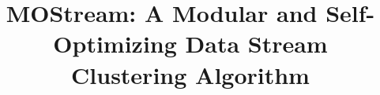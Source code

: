 \documentclass[conference]{IEEEtran}
\begin{document}
\title{MOStream: A Modular and Self-Optimizing Data Stream Clustering Algorithm}




\maketitle


\compact

\compact

\compact
% 

\compact
 
\compact
% 

\compact

% 


\end{document}
